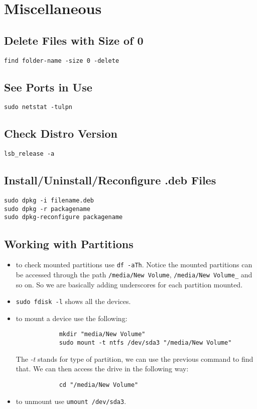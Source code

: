 \documentclass[a4paper, 12pt]{article}
\begin{document}
\section{Miscellaneous}
\subsection{Delete Files with Size of 0}
\verb|find folder-name -size 0 -delete|
\subsection{See Ports in Use}
\verb|sudo netstat -tulpn|
\subsection{Check Distro Version}
\verb|lsb_release -a|
\subsection{Install/Uninstall/Reconfigure .deb Files}
\begin{verbatim}
sudo dpkg -i filename.deb
sudo dpkg -r packagename
sudo dpkg-reconfigure packagename
\end{verbatim}
\subsection{Working with Partitions}
\begin{itemize}
	\item to check mounted partitions use \verb|df -aTh|. Notice the mounted partitions can be accessed through the path \verb|/media/New Volume|, \verb|/media/New Volume_| and so on. So we are basically adding underscores for each partition mounted.
	\item \verb|sudo fdisk -l| shows all the devices.
	\item to mount a device use the following:
		\begin{verbatim}
			mkdir "media/New Volume"
			sudo mount -t ntfs /dev/sda3 "/media/New Volume"
		\end{verbatim}
		The \emph{-t} stands for type of partition, we can use the previous command to find that. We can then access the drive in the following way:
		\begin{verbatim}
			cd "/media/New Volume"
		\end{verbatim}
	\item to unmount use \verb|umount /dev/sda3|.
\end{itemize}
\end{document}

